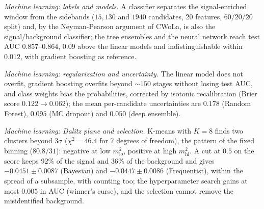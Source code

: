 \emph{Machine learning: labels and models.} A classifier separates the signal-enriched window from the sidebands ($15{,}130$ and $1940$ candidates, $20$ features, $60/20/20$ split) and, by the Neyman-Pearson argument of CWoLa, is also the signal/background classifier; the tree ensembles and the neural network reach test AUC $0.857$--$0.864$, $0.09$ above the linear models and indistinguishable within $0.012$, with gradient boosting as reference.

\emph{Machine learning: regularization and uncertainty.} The linear model does not overfit, gradient boosting overfits beyond $\sim150$ stages without losing test AUC, and class weights bias the probabilities, corrected by isotonic recalibration (Brier score $0.122\to0.062$); the mean per-candidate uncertainties are $0.178$ (Random Forest), $0.095$ (MC dropout) and $0.050$ (deep ensemble).

\emph{Machine learning: Dalitz plane and selection.} K-means with $K=8$ finds two clusters beyond $3\sigma$ ($\chi^2=46.4$ for $7$ degrees of freedom), the pattern of the fixed binning ($80.8/31$): negative at low $m^2_{\mathrm{lo}}$, positive at high $m^2_{\mathrm{hi}}$. A cut at $0.5$ on the score keeps $92\%$ of the signal and $36\%$ of the background and gives $-0.0451\pm0.0087$ (Bayesian) and $-0.0447\pm0.0086$ (Frequentist), within the spread of a subsample, with counting too; the hyperparameter search gains at most $0.005$ in AUC (winner's curse), and the selection cannot remove the misidentified background.
